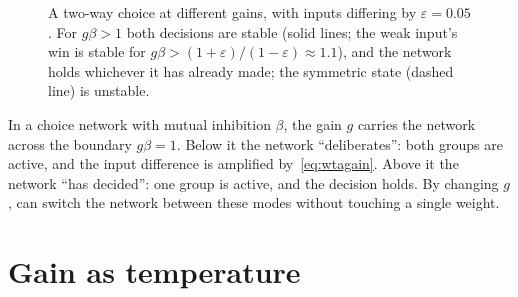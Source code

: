 \begin{figure}[t]
\centering
{}
\caption{A two-way choice at different gains, with inputs differing by $\varepsilon=0.05$. For $g\beta>1$ both decisions are stable (solid lines; the weak input's win is stable for $g\beta>(1+\varepsilon)/(1-\varepsilon)\approx1.1$), and the network holds whichever it has already made; the symmetric state (dashed line) is unstable.}
\label{fig:pitchfork}
\end{figure}

\begin{keyblock}
\begin{proposition}
\label{prop:gainwta}
In a choice network with mutual inhibition $\beta$, the gain $g$ carries the network across the boundary $g\beta=1$. Below it the network ``deliberates'': both groups are active, and the input difference is amplified by~\eqref{eq:wtagain}. Above it the network ``has decided'': one group is active, and the decision holds. By changing $g$,  can switch the network between these modes without touching a single weight.
\end{proposition}
\end{keyblock}

\section{Gain as temperature}

